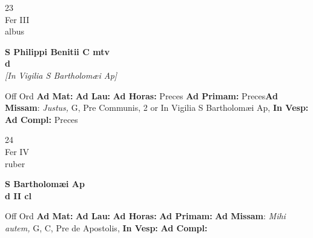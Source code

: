\documentclass[10pt, openany]{book}
\begin{document}
        \begin{center}
            \begin{minipage}{3.5in}
                \vspace{2em}
                \begin{minipage}{0.5in}
                    {\Huge 23} \\
                    {\normalsize Fer III} \\
                    {\normalsize albus}
                \end{minipage}
                \begin{minipage}{3.0in}
                    \textbf{ \large S Philippi Benitii C mtv \\
                    \textnormal{\normalsize d}} \\ \textit{[In Vigilia S Bartholomæi Ap]} \\ 
                \end{minipage}
                \begin{justify}Off Ord
                    \textbf{Ad Mat: }
                    \textbf{Ad Lau: }
                    \textbf{Ad Horas: }Preces
                    \textbf{Ad Primam: }Preces\textbf{Ad Missam}: \textit{Justus,} G, Pre Communis, 2 or In Vigilia S Bartholomæi Ap,  
                    \textbf{In Vesp: }
                    \textbf{Ad Compl: }Preces
                \end{justify}
            \end{minipage}
        \end{center}
    
        \begin{center}
            \begin{minipage}{3.5in}
                \vspace{2em}
                \begin{minipage}{0.5in}
                    {\Huge 24} \\
                    {\normalsize Fer IV} \\
                    {\normalsize ruber}
                \end{minipage}
                \begin{minipage}{3.0in}
                    \textbf{ \large S Bartholomæi Ap \\
                    \textnormal{\normalsize d II cl}} \\ 
                \end{minipage}
                \begin{justify}Off Ord
                    \textbf{Ad Mat: }
                    \textbf{Ad Lau: }
                    \textbf{Ad Horas: }
                    \textbf{Ad Primam: }\textbf{Ad Missam}: \textit{Mihi autem,} G, C, Pre de Apostolis,  
                    \textbf{In Vesp: }
                    \textbf{Ad Compl: }
                \end{justify}
            \end{minipage}
        \end{center}
    
\end{document}
